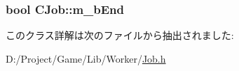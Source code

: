 \subsubsection[{m\+\_\+b\+End}]{\setlength{\rightskip}{0pt plus 5cm}bool C\+Job\+::m\+\_\+b\+End\hspace{0.3cm}{\ttfamily [private]}}\label{class_c_job_afcf1f1b7b2563cc20a5e2d596f7c06a3}


このクラス詳解は次のファイルから抽出されました\+:\begin{DoxyCompactItemize}
\item 
D\+:/\+Project/\+Game/\+Lib/\+Worker/\hyperlink{_job_8h}{Job.\+h}\end{DoxyCompactItemize}
